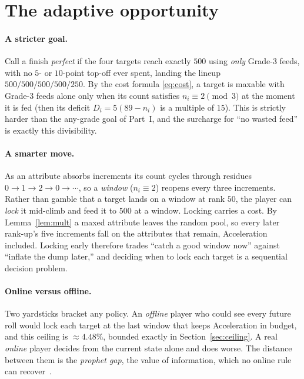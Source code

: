 \documentclass[11pt]{article}
\theoremstyle{remark}
\begin{document}
\section{The adaptive opportunity}\label{sec:adaptive}

\paragraph{A stricter goal.}
Call a finish \emph{perfect} if the four targets reach exactly $500$ using
\emph{only} Grade-3 feeds, with no $5$- or $10$-point top-off ever spent, landing the
lineup $500/500/500/500/250$. By the cost formula \eqref{eq:cost}, a target is
maxable with Grade-3 feeds alone only when its count satisfies $n_i\equiv 2\pmod 3$
at the moment it is fed (then its deficit $D_i=5(89-n_i)$ is a multiple of $15$). This
is strictly harder than the any-grade goal of Part~I, and the surcharge for ``no
wasted feed'' is exactly this divisibility.

\paragraph{A smarter move.}
As an attribute absorbs increments its count cycles through residues
$0\to1\to2\to0\to\cdots$, so a \emph{window} ($n_i\equiv 2$) reopens every three
increments. Rather than gamble that a target lands on a window at rank $50$, the
player can \emph{lock} it mid-climb and feed it to $500$ at a window. Locking carries
a cost. By Lemma~\ref{lem:mult} a maxed attribute leaves the random pool, so every later
rank-up's five increments fall on the attributes that remain, Acceleration included.
Locking early therefore trades ``catch a good window now'' against ``inflate the dump
later,'' and deciding when to lock each target is a sequential decision problem.

\paragraph{Online versus offline.}
Two yardsticks bracket any policy. An \emph{offline} player who could see every
future roll would lock each target at the last window that keeps Acceleration in
budget, and this ceiling is $\approx 4.48\%$, bounded exactly in
Section~\ref{sec:ceiling}. A real \emph{online} player decides from the current state
alone and does worse. The distance between them is the \emph{prophet gap}, the value
of information, which no online rule can recover~\cite{prophet}.
\end{document}
